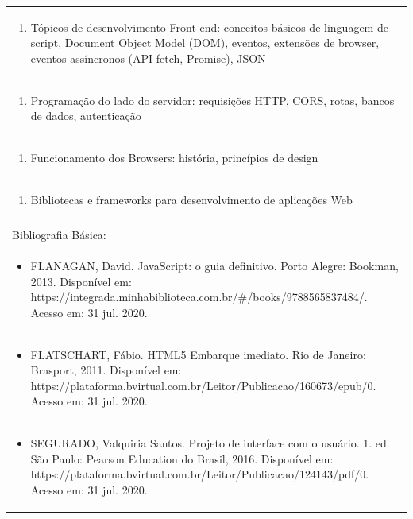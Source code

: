 \documentclass[11pt]{article}
\begin{document}
\begin{center}
\begin{longtable}{|p{4cm}|p{4cm}|p{4cm}|p{4cm}|}
\multicolumn{4}{|p{\dimexpr 16cm + 6\tabcolsep\relax}|}{\begin{enumerate}[start=2]\item Tópicos de desenvolvimento Front-end: conceitos básicos de linguagem de script, Document Object Model (DOM), eventos, extensões de browser, eventos assíncronos (API fetch, Promise), JSON\end{enumerate}}\\
\multicolumn{4}{|p{\dimexpr 16cm + 6\tabcolsep\relax}|}{\begin{enumerate}[start=3]\item Programação do lado do servidor: requisições HTTP, CORS, rotas, bancos de dados, autenticação\end{enumerate}}\\
\multicolumn{4}{|p{\dimexpr 16cm + 6\tabcolsep\relax}|}{\begin{enumerate}[start=4]\item Funcionamento dos Browsers: história, princípios de design\end{enumerate}}\\
\multicolumn{4}{|p{\dimexpr 16cm + 6\tabcolsep\relax}|}{\begin{enumerate}[start=5]\item Bibliotecas e frameworks para desenvolvimento de aplicações Web\end{enumerate}}\\
\multicolumn{4}{|p{\dimexpr 16cm + 6\tabcolsep\relax}|}{}\\
\hline
\multicolumn{4}{|p{16cm}|}{Bibliografia Básica:}\\*
\multicolumn{4}{|p{\dimexpr 16cm + 6\tabcolsep\relax}|}{\begin{itemize}\item FLANAGAN, David. JavaScript: o guia definitivo. Porto Alegre: Bookman, 2013. Disponível em: https://integrada.minhabiblioteca.com.br/\#/books/9788565837484/. Acesso em: 31 jul. 2020.\end{itemize}}\\
\multicolumn{4}{|p{\dimexpr 16cm + 6\tabcolsep\relax}|}{\begin{itemize}\item FLATSCHART, Fábio. HTML5 Embarque imediato. Rio de Janeiro: Brasport, 2011. Disponível em: https://plataforma.bvirtual.com.br/Leitor/Publicacao/160673/epub/0. Acesso em: 31 jul. 2020.\end{itemize}}\\
\multicolumn{4}{|p{\dimexpr 16cm + 6\tabcolsep\relax}|}{\begin{itemize}\item SEGURADO, Valquiria Santos. Projeto de interface com o usuário. 1. ed. São Paulo: Pearson Education do Brasil, 2016. Disponível em: https://plataforma.bvirtual.com.br/Leitor/Publicacao/124143/pdf/0. Acesso em: 31 jul. 2020.\end{itemize}}\\

\end{longtable}
\end{center}
\end{document}
